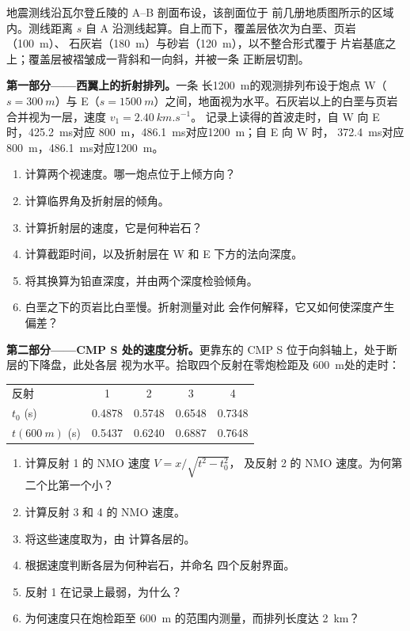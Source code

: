 \begin{problem}
\label{pb:b3:exploration-seismology:1}
地震测线沿瓦尔登丘陵的 A--B 剖面布设，该剖面位于
前几册地质图所示的区域内。测线距离 $s$ 自
A 沿测线起算。自上而下，覆盖层依次为白垩、页岩（\qty{100}{m}）、
石灰岩（\qty{180}{m}）与砂岩（\qty{120}{m}），以不整合形式覆于
片岩基底之上；覆盖层被褶皱成一背斜和一向斜，并被一条
正断层切割。

\medskip
\noindent\textbf{第一部分——西翼上的折射排列。}一条
长\qty{1200}{m}的观测排列布设于炮点 W（$s = \qty{300}{m}$）与
E（$s = \qty{1500}{m}$）之间，地面视为水平。石灰岩以上的白垩与页岩
合并视为一层，速度 $v_1 = \qty{2.40}{km.s^{-1}}$。
记录上读得的首波走时，自 W 向 E 时，\qty{425.2}{ms}对应
\qty{800}{m}，\qty{486.1}{ms}对应\qty{1200}{m}；自 E 向 W 时，
\qty{372.4}{ms}对应\qty{800}{m}，\qty{486.1}{ms}对应\qty{1200}{m}。
\begin{enumerate}
  \item 计算两个视速度。哪一炮点位于上倾方向？
  \item 计算临界角及折射层的倾角。
  \item 计算折射层的速度，它是何种岩石？
  \item 计算截距时间，以及折射层在
        W 和 E 下方的法向深度。
  \item 将其换算为铅直深度，并由两个深度检验倾角。
  \item 白垩之下的页岩比白垩慢。折射测量对此
        会作何解释，它又如何使深度产生偏差？
\end{enumerate}

\noindent\textbf{第二部分——CMP S 处的速度分析。}更靠东的 CMP S
位于向斜轴上，处于断层的下降盘，此处各层
视为水平。拾取四个反射在零炮检距及
\qty{600}{m}处的走时：
\begin{center}
\small
\begin{tabular}{lcccc}
\hline
反射 & 1 & 2 & 3 & 4 \\
$t_0$ (\unit{s}) & 0.4878 & 0.5748 & 0.6548 & 0.7348 \\
$t(\qty{600}{m})$ (\unit{s}) & 0.5437 & 0.6240 & 0.6887 & 0.7648 \\
\hline
\end{tabular}
\end{center}
\begin{enumerate}[resume]
  \item 计算反射 1 的 NMO 速度 $V = x/\sqrt{t^2 - t_0^2}$，
        及反射 2 的 NMO 速度。为何第二个比第一个小？
  \item 计算反射 3 和 4 的 NMO 速度。
  \item 将这些速度取为，由
        计算各层的。
  \item 根据速度判断各层为何种岩石，并命名
        四个反射界面。
  \item 反射 1 在记录上最弱，为什么？
  \item 为何速度只在炮检距至 \qty{600}{m}
        的范围内测量，而排列长度达 \qty{2}{km}？
\end{enumerate}


\end{problem}
